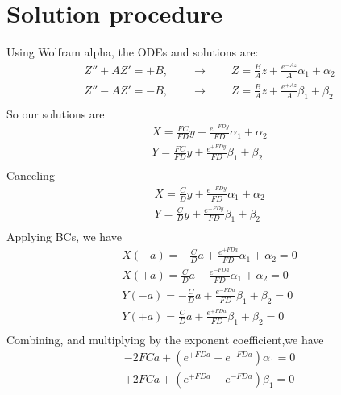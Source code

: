 \documentclass[11pt]{article}
\begin{document}
\section{Solution procedure}
Using Wolfram alpha, the ODEs and solutions are:
\begin{equation}\begin{aligned}
	Z'' + A Z' = +B, \qquad \rightarrow \qquad Z = \frac{B}{A} z + \frac{e^{-A z}}{A} \alpha_1 +\alpha_2 \\
	Z'' - A Z' = -B, \qquad \rightarrow \qquad Z = \frac{B}{A} z + \frac{e^{+A z}}{A} \beta_1  +\beta_2  \\
\end{aligned} \end{equation}
So our solutions are
\begin{equation}\begin{aligned}
	X = \frac{FC}{FD} y + \frac{e^{-FD y}}{FD} \alpha_1 +\alpha_2 \\
	Y = \frac{FC}{FD} y + \frac{e^{+FD y}}{FD} \beta_1  +\beta_2  \\
\end{aligned} \end{equation}
Canceling
\begin{equation}\begin{aligned}
	X = \frac{C}{D} y + \frac{e^{-FD y}}{FD} \alpha_1 +\alpha_2 \\
	Y = \frac{C}{D} y + \frac{e^{+FD y}}{FD} \beta_1  +\beta_2  \\
\end{aligned} \end{equation}
Applying BCs, we have
\begin{equation}\begin{aligned}
	X(-a) = -\frac{C}{D} a + \frac{e^{+FD a}}{FD} \alpha_1 +\alpha_2 = 0\\
	X(+a) =  \frac{C}{D} a + \frac{e^{-FD a}}{FD} \alpha_1 +\alpha_2 = 0\\
	Y(-a) = -\frac{C}{D} a + \frac{e^{-FD a}}{FD} \beta_1  +\beta_2  = 0\\
	Y(+a) =  \frac{C}{D} a + \frac{e^{+FD a}}{FD} \beta_1  +\beta_2  = 0\\
\end{aligned} \end{equation}
Combining, and multiplying by the exponent coefficient,we have
\begin{equation}\begin{aligned}
- 2 FCa + \left(e^{+FD a} - e^{-FD a} \right) \alpha_1 = 0\\
+ 2 FCa + \left(e^{+FD a} - e^{-FD a} \right) \beta_1  = 0\\
\end{aligned} \end{equation}
\end{document}
